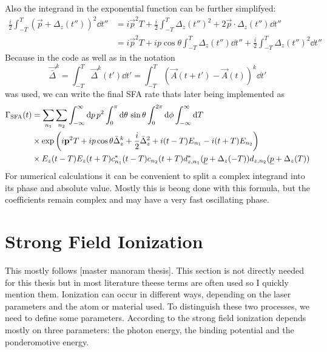 Also the integrand in the exponential function can be further simplifyed:
\begin{align*}
    \frac{i}{2}\int_{-T}^{T}(\vec{p}+\Delta_z(t''))^2\dd t'' &= i\vec{p}^2T + \frac{i}{2}\int_{-T}^{T}\Delta_z(t'')^2+2\vec{p}\cdot\Delta_z(t'')\dd t'' \\
    &= i\vec{p}^2T + ip\cos\theta\int_{-T}^{T}\Delta_z(t'')\dd t'' +  \frac{i}{2}\int_{-T}^{T}\Delta_z(t'')^2\dd t''
\end{align*}
Because in the code as well as in \cite{Theory_NPS} the notation
\begin{equation*}
    \vec{\bar{\Delta}}^k = \int_{-T}^{T}\vec{\Delta}^k(t')\dd t' = \int_{-T}^{T}\left(\vec{A}(t+t') - \vec{A}(t)\right)^k\dd t'
\end{equation*}
was used, we can write the final SFA rate thats later being implemented as
\begin{align*}
    \Gamma_{\mathrm{SFA}}(t) &= \sum_{n_1}\sum_{n_2} \int_{-\infty}^{\infty} \mathrm{d} p\,p^2\int_0^{\pi} \mathrm{d}\theta\,\sin\theta \int_0^{2\pi}\mathrm{d} \phi\int_{-\infty}^{\infty} \mathrm{d} T\\
    &\times \exp\left(i\mathbf{p}^2T + ip\cos\theta\bar{\Delta}_z^k +  \frac{i}{2}\bar{\Delta}_z^2  + i(t-T)E_{n_1}-i(t+T)E_{n_2}\right)\\
    &\times E_z(t-T) E_z(t+T)c_{n_1}^*(t-T)c_{n_2}(t+T) d_{z,n_1}^*(\underline{p}+\Delta_z(-T))d_{z,n_2}(\underline{p}+\Delta_z(T))
\end{align*}
For numerical calculations it can be convenient to split a complex integrand into its phase and absolute value. 
Mostly this is beong done with this formula, but the coefficients remain complex and may have a very fast oscillating phase.









\newpage
\section{Strong Field Ionization}
This mostly follows [master manoram thesis].
This section is not directly needed for this thesis but in most literature theese terms are often used so I quickly mention them.
Ionization can occur in different ways, depending on the laser parameters and the atom or material used. 
To distinguish these two processes, we need to define some parameters. 
According to \cite{Keldysh:1965ojf} the strong field ionization depends mostly on three parameters: the photon energy, the binding potential and the ponderomotive energy.


